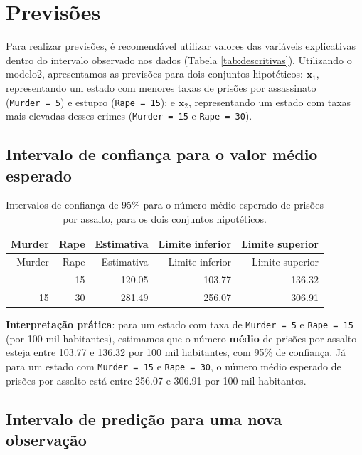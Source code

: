 \documentclass[a4paper]{modeloUFCG} %
\begin{document}
\section{Previsões}\label{previsuxf5es}

Para realizar previsões, é recomendável utilizar valores das variáveis explicativas dentro do intervalo observado nos dados
(Tabela \ref{tab:descritivas}). Utilizando o modelo2, apresentamos as previsões para dois conjuntos hipotéticos: \(\mathbf{x}_1\),
representando um estado com menores taxas de prisões por assassinato (\texttt{Murder\ =\ 5}) e estupro (\texttt{Rape\ =\ 15}); e \(\mathbf{x}_2\),
representando um estado com taxas mais elevadas desses crimes (\texttt{Murder\ =\ 15} e \texttt{Rape\ =\ 30}).

\subsection{Intervalo de confiança para o valor médio esperado}\label{intervalo-de-confianuxe7a-para-o-valor-muxe9dio-esperado}

\begin{longtable}[]{@{}rrrrr@{}}
\caption{\label{tab:previsaoConfianca} Intervalos de confiança de 95\% para o número médio esperado de prisões por assalto, para os dois
conjuntos hipotéticos.}\tabularnewline
\toprule\noalign{}
Murder & Rape & Estimativa & Limite inferior & Limite superior \\
\midrule\noalign{}
\endfirsthead
\toprule\noalign{}
Murder & Rape & Estimativa & Limite inferior & Limite superior \\
\midrule\noalign{}
\endhead
\bottomrule\noalign{}
\endlastfoot
5 & 15 & 120.05 & 103.77 & 136.32 \\
15 & 30 & 281.49 & 256.07 & 306.91 \\
\end{longtable}

\textbf{Interpretação prática}: para um estado com taxa de \texttt{Murder\ =\ 5} e \texttt{Rape\ =\ 15} (por 100 mil habitantes), estimamos que o número
\textbf{médio} de prisões por assalto esteja entre 103.77 e 136.32 por 100 mil habitantes, com 95\% de
confiança. Já para um estado com \texttt{Murder\ =\ 15} e \texttt{Rape\ =\ 30}, o número médio esperado de prisões por assalto está entre
256.07 e 306.91 por 100 mil habitantes.

\subsection{Intervalo de predição para uma nova observação}\label{intervalo-de-prediuxe7uxe3o-para-uma-nova-observauxe7uxe3o}
\end{document}
